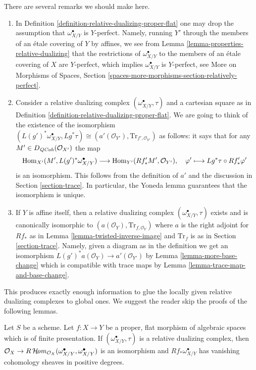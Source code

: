 \noindent
There are several remarks we should make here.
\begin{enumerate}
\item In Definition \ref{definition-relative-dualizing-proper-flat}
one may drop the assumption that $\omega_{X/Y}^\bullet$ is $Y$-perfect.
Namely, running $Y'$ through the members of an \'etale covering of $Y$
by affines, we see from Lemma \ref{lemma-properties-relative-dualizing}
that the restrictions of $\omega_{X/Y}^\bullet$ to the members of
an \'etale covering of $X$ are $Y$-perfect, which implies
$\omega_{X/Y}^\bullet$ is $Y$-perfect, see
More on Morphisms of Spaces, Section
\ref{spaces-more-morphisms-section-relatively-perfect}.
\item Consider a relative dualizing complex
$(\omega_{X/Y}^\bullet, \tau)$ and a cartesian square as in
Definition \ref{definition-relative-dualizing-proper-flat}.
We are going to think of the existence of the isomorphism
$(L(g')^*\omega_{X/Y}^\bullet, Lg^*\tau) \cong
(a'(\mathcal{O}_{Y'}), \text{Tr}_{f', \mathcal{O}_{Y'}})$
as follows: it says that for any $M' \in D_{\mathit{QCoh}}(\mathcal{O}_{X'})$
the map
$$
\mathop{\mathrm{Hom}}\nolimits_{X'}(M', L(g')^*\omega_{X/Y}^\bullet)
\longrightarrow
\mathop{\mathrm{Hom}}\nolimits_{Y'}(Rf'_*M', \mathcal{O}_{Y'}),\quad
\varphi' \longmapsto Lg^*\tau \circ Rf'_*\varphi'
$$
is an isomorphism. This follows from the definition of $a'$
and the discussion in Section \ref{section-trace}. In particular,
the Yoneda lemma guarantees that the isomorphism is unique.
\item If $Y$ is affine itself, then a relative dualizing complex
$(\omega_{X/Y}^\bullet, \tau)$ exists and is canonically isomorphic
to $(a(\mathcal{O}_Y), \text{Tr}_{f, \mathcal{O}_Y})$ where
$a$ is the right adjoint for $Rf_*$ as in
Lemma \ref{lemma-twisted-inverse-image}
and $\text{Tr}_f$ is as in Section \ref{section-trace}.
Namely, given a diagram as in the definition we get
an isomorphism $L(g')^*a(\mathcal{O}_Y) \to a'(\mathcal{O}_{Y'})$ by
Lemma \ref{lemma-more-base-change}
which is compatible with trace maps by
Lemma \ref{lemma-trace-map-and-base-change}.
\end{enumerate}
This produces exactly enough information to glue the locally given
relative dualizing complexes to global ones. We suggest the reader
skip the proofs of the following lemmas.

\begin{lemma}
\label{lemma-relative-dualizing-RHom}
Let $S$ be a scheme. Let $f : X \to Y$ be a proper, flat morphism of
algebraic spaces which is of finite presentation.
If $(\omega_{X/Y}^\bullet, \tau)$ is a relative dualizing complex,
then  $\mathcal{O}_X \to
R\mathop{\mathcal{H}\!\mathit{om}}\nolimits_{\mathcal{O}_X}(\omega_{X/Y}^\bullet, \omega_{X/Y}^\bullet)$
is an isomorphism and $Rf_*\omega_{X/Y}^\bullet$ has vanishing cohomology
sheaves in positive degrees.
\end{lemma}

